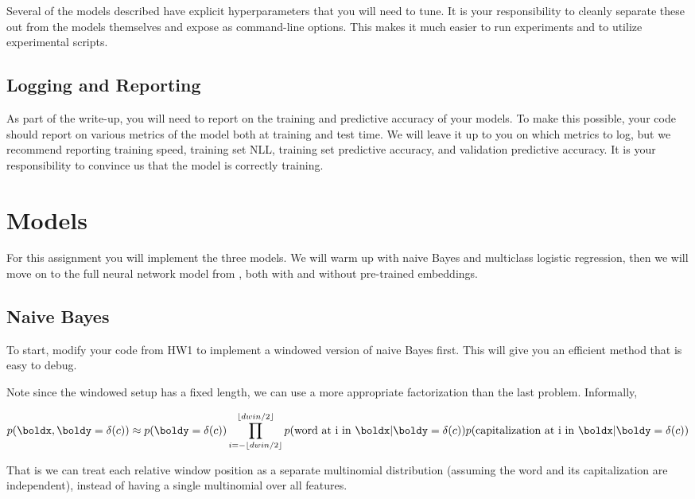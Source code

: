 \documentclass[11pt]{article}
\begin{document}
Several of the models described have explicit hyperparameters that you will 
need to tune. It is your responsibility to cleanly separate these out from 
the models themselves and expose as command-line options. This makes it much 
easier to run experiments and to utilize experimental scripts. 

\subsection{Logging and Reporting}

As part of the write-up, you will need to report on the training and
predictive accuracy of your models. To make this possible, your code
should report on various metrics of the model both at training and
test time. We will leave it up to you on which metrics to log, but we
recommend reporting training speed, training set NLL, training set
predictive accuracy, and validation predictive accuracy. It is your
responsibility to convince us that the model is correctly training.

\section{Models}

For this assignment you will implement the three models. We will warm
up with naive Bayes and multiclass logistic regression, then we will
move on to the full neural network model from
\citet{collobert2011natural}, both with and without pre-trained embeddings.

\subsection{Naive Bayes}

To start, modify your code from HW1
to implement a windowed version of
naive Bayes first. This will give
you an efficient method that is easy
to debug.

Note since the windowed setup has a fixed length, we can use a more appropriate 
factorization than the last problem. Informally,

\[ p(\boldx, \boldy=\delta(c)) \approx p(\boldy=\delta(c)) \prod_{i=-\lfloor{dwin/2}\rfloor}^{\lfloor{dwin/2}\rfloor}
p(\mathrm{word\ at\ i\ in\ }\boldx | \boldy =\delta(c))
p(\mathrm{capitalization\ at\ i\ in\ }\boldx | \boldy =\delta(c)) \]

That is we can treat each relative window position as a separate
multinomial distribution (assuming the word and its
capitalization are independent), instead of having a single multinomial
over all features.
\end{document}
